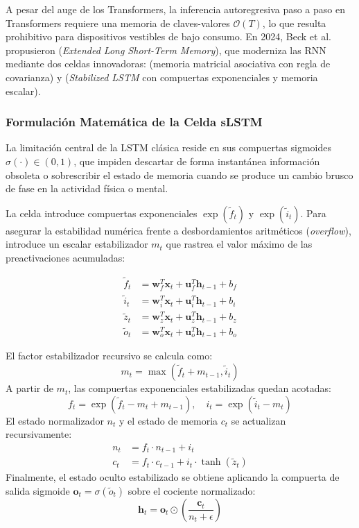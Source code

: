A pesar del auge de los Transformers, la inferencia autoregresiva paso a paso en Transformers requiere una memoria de claves-valores $\mathcal{O}(T)$, lo que resulta prohibitivo para dispositivos vestibles de bajo consumo. En 2024, Beck et al. \cite{beck2024xlstm} propusieron \xlstm{} (\textit{Extended Long Short-Term Memory}), que moderniza las RNN mediante dos celdas innovadoras: \mlstm{} (memoria matricial asociativa con regla de covarianza) y \slstm{} (\textit{Stabilized LSTM} con compuertas exponenciales y memoria escalar).

\subsubsection{Formulación Matemática de la Celda sLSTM}
La limitación central de la LSTM clásica reside en sus compuertas sigmoides $\sigma(\cdot) \in (0, 1)$, que impiden descartar de forma instantánea información obsoleta o sobrescribir el estado de memoria cuando se produce un cambio brusco de fase en la actividad física o mental.

La celda \slstm{} introduce compuertas exponenciales $\exp(\tilde{f}_t)$ y $\exp(\tilde{i}_t)$. Para asegurar la estabilidad numérica frente a desbordamientos aritméticos (\textit{overflow}), introduce un escalar estabilizador $m_t$ que rastrea el valor máximo de las preactivaciones acumuladas:

\begin{align}
    \tilde{f}_t &= \bm{w}_f^T \bm{x}_t + \bm{u}_f^T \bm{h}_{t-1} + b_f \\
    \tilde{i}_t &= \bm{w}_i^T \bm{x}_t + \bm{u}_i^T \bm{h}_{t-1} + b_i \\
    \tilde{z}_t &= \bm{w}_z^T \bm{x}_t + \bm{u}_z^T \bm{h}_{t-1} + b_z \\
    \tilde{o}_t &= \bm{w}_o^T \bm{x}_t + \bm{u}_o^T \bm{h}_{t-1} + b_o
\end{align}

El factor estabilizador recursivo se calcula como:
\begin{equation}
    m_t = \max(\tilde{f}_t + m_{t-1}, \tilde{i}_t)
\end{equation}
A partir de $m_t$, las compuertas exponenciales estabilizadas quedan acotadas:
\begin{equation}
    f_t = \exp(\tilde{f}_t - m_t + m_{t-1}), \quad i_t = \exp(\tilde{i}_t - m_t)
\end{equation}
El estado normalizador $n_t$ y el estado de memoria $c_t$ se actualizan recursivamente:
\begin{align}
    n_t &= f_t \cdot n_{t-1} + i_t \\
    c_t &= f_t \cdot c_{t-1} + i_t \cdot \tanh(\tilde{z}_t)
\end{align}
Finalmente, el estado oculto estabilizado se obtiene aplicando la compuerta de salida sigmoide $\bm{o}_t = \sigma(\tilde{o}_t)$ sobre el cociente normalizado:
\begin{equation}
    \bm{h}_t = \bm{o}_t \odot \left( \frac{\bm{c}_t}{n_t + \epsilon} \right)
\end{equation}

